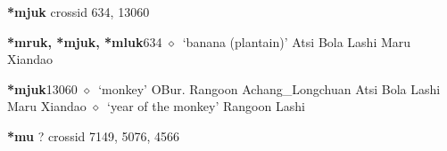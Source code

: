 \item
\textbf{*mjuk}
  {\tiny crossid 634, 13060}
  \begin{list}{}{\leftmargin=1.5em \itemindent=-1.5em}
  \item {\footnotesize \textbf{*mruk, *mjuk, *mluk}}{\tiny 634}
         $\diamond$~`banana (plantain)'
         Atsi 
\hspace{1ex}
         Bola 
\hspace{1ex}
         Lashi 
\hspace{1ex}
         Maru 
\hspace{1ex}
         Xiandao 
  \item {\footnotesize \textbf{*mjuk}}{\tiny 13060}
\hspace{1ex}
         $\diamond$~`monkey'
         OBur. 
\hspace{1ex}
         Rangoon 
\hspace{1ex}
         Achang\_Longchuan 
\hspace{1ex}
         Atsi 
\hspace{1ex}
         Bola 
\hspace{1ex}
         Lashi 
\hspace{1ex}
         Maru 
\hspace{1ex}
         Xiandao 
\hspace{1ex}
         $\diamond$~`year of the monkey'
         Rangoon 
\hspace{1ex}
         Lashi 
  \end{list}
\item
\textbf{*mu}
?
  {\tiny crossid 7149, 5076, 4566}
